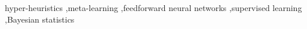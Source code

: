 \begin{keyword}

	hyper-heuristics \sep meta-learning \sep feedforward neural networks \sep supervised learning \sep Bayesian statistics

\end{keyword}